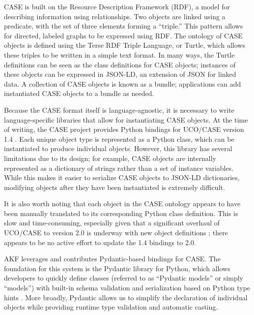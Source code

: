 \documentclass[letterpaper,12pt]{report}
\begin{document}
CASE is built on the Resource Description Framework (RDF), a model for
describing information using relationships. Two objects are linked using
a predicate, with the set of three elements forming a ``triple.'' This
pattern allows for directed, labeled graphs to be expressed using RDF.
The ontology of CASE objects is defined using the Terse RDF Triple
Language, or Turtle, which allows these triples to be written in a
simple text format. In many ways, the Turtle definitions can be seen as
the class definitions for CASE objects; instances of these objects can
be expressed in JSON-LD, an extension of JSON for linked data. A
collection of CASE objects is known as a bundle; applications can add
instantiated CASE objects to a bundle as needed.

Because the CASE format itself is language-agnostic, it is necessary to
write language-specific libraries that allow for instantiating CASE
objects. At the time of writing, the CASE project provides Python
bindings for UCO/CASE version 1.4 \cite{CaseworkCASEMappingPython}.
Each unique object type is represented as a Python class, which can be
instantiated to produce individual objects. However, this library has
several limitations due to its design; for example, CASE objects are
internally represented as a dictionary of strings rather than a set of
instance variables. While this makes it easier to serialize CASE objects
to JSON-LD dictionaries, modifying objects after they have been
instantiated is extremely difficult.

It is also worth noting that each object in the CASE ontology appears to
have been manually translated to its corresponding Python class
definition. This is slow and time-consuming, especially given that a
significant overhaul of UCO/CASE to version 2.0 is underway with new
object definitions \cite{UcoProjectUCODevelop2002025}; there appears
to be no active effort to update the 1.4 bindings to 2.0.

AKF leverages and contributes Pydantic-based bindings for CASE. The
foundation for this system is the Pydantic library for Python, which
allows developers to quickly define classes (referred to as ``Pydantic
models'' or simply ``models'') with built-in schema validation and
serialization based on Python type hints \cite{colvinPydantic2024}.
More broadly, Pydantic allows us to simplify the declaration of
individual objects while providing runtime type validation and automatic
casting.
\end{document}
